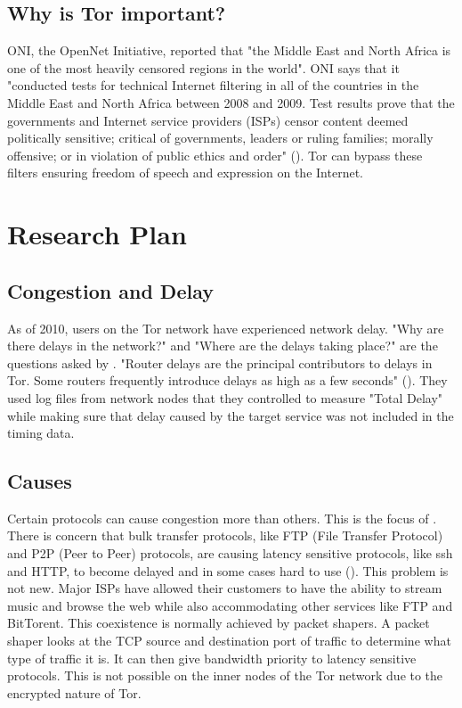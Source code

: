 \documentclass[letterpaper,13pt]{texMemo}
\begin{document}
    \subsection*{Why is Tor important?}
    ONI, the OpenNet Initiative, reported that "the Middle East and North Africa is one of the most
    heavily censored regions in the world". ONI says that it "conducted tests for technical
    Internet filtering in all of the countries in the Middle East and North Africa between 2008 and
    2009. Test results prove that the governments and Internet service providers (ISPs) censor
    content deemed politically sensitive; critical of governments, leaders or ruling families;
    morally offensive; or in violation of public ethics and order" (\citeauthor[6]{ONI}). Tor can
    bypass these filters ensuring freedom of speech and expression on the Internet.

\section*{Research Plan}


    \subsection*{Congestion and Delay}
    As of 2010, users on the Tor network have experienced network delay. "Why are there delays in
    the network?" and "Where are the delays taking place?" are the questions asked by
    \citeauthor[]{delay}. "Router delays are the principal contributors to delays in Tor. Some
    routers frequently introduce delays as high as a few seconds" (\citeauthor[3]{delay}). They used
    log files from network nodes that they controlled to measure "Total Delay" while making sure
    that delay caused by the target service was not included in the timing data.

    \subsection*{Causes}
    Certain protocols can cause congestion more than others. This is the focus of
    \citeauthor{analysis}. There is concern that bulk transfer protocols, like FTP (File Transfer
    Protocol) and P2P (Peer to Peer) protocols, are causing latency sensitive protocols, like ssh
    and HTTP, to become delayed and in some cases hard to use (\citeauthor[2]{analysis}). This
    problem is not new. Major ISPs have allowed their customers to have the ability to stream music
    and browse the web while also accommodating other services like FTP and BitTorent. This
    coexistence is normally achieved by packet shapers. A packet shaper looks at the TCP source and
    destination port of traffic to determine what type of traffic it is. It can then give
    bandwidth priority to latency sensitive protocols. This is not possible on the inner nodes of
    the Tor network due to the encrypted nature of Tor.
\end{document}

